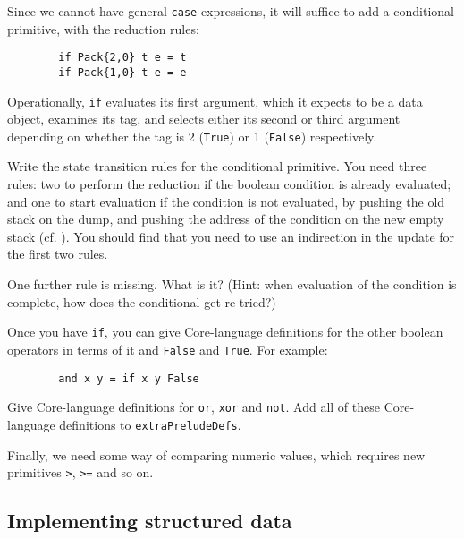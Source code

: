 Since we cannot have general \mbox{\tt case} expressions, it will suffice to add
a conditional primitive,
with the reduction rules:
\begin{verbatim}
        if Pack{2,0} t e = t
        if Pack{1,0} t e = e
\end{verbatim}
Operationally, \mbox{\tt if} evaluates its first argument, which it expects to be a
data object, examines its tag, and selects either its second or third argument
depending on whether the tag is 2 (\mbox{\tt True}) or 1 (\mbox{\tt False}) respectively.

\begin{exercise}
Write the state transition rules for the conditional primitive.
You need three rules: two to perform the reduction if the boolean
condition is already evaluated; and one to start evaluation if the
condition is not evaluated, by pushing the old
stack on the dump, and pushing the
address of the condition on the new empty stack (cf. ).
You should find that you need to use an indirection in the update for
the first two rules.

One further rule is missing.  What is it?  (Hint: when evaluation
of the condition is complete, how does the conditional get re-tried?)
\end{exercise}

Once you have \mbox{\tt if}, you can give Core-language definitions for
the other boolean operators in terms of
it and \mbox{\tt False} and \mbox{\tt True}.  For example:
\begin{verbatim}
        and x y = if x y False
\end{verbatim}

\begin{exercise}
\label{ex:templ:prelude-bool}
Give Core-language definitions for \mbox{\tt or}, \mbox{\tt xor} and \mbox{\tt not}.
Add all of these Core-language definitions to \mbox{\tt extraPreludeDefs}.
\end{exercise}

Finally, we need some way of comparing numeric values, which requires
new primitives \mbox{\tt >}, \mbox{\tt >=} and so on.

\subsection{Implementing structured data}

